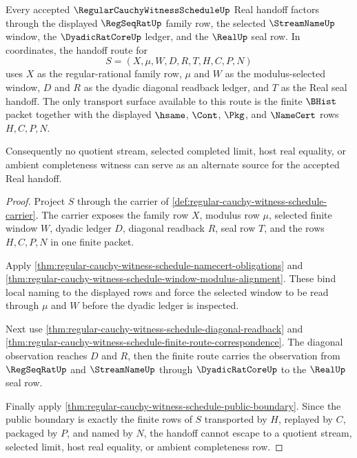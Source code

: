 \begin{theorem}
\label{thm:regular-cauchy-witness-schedule-real-handoff-dependency}
Every accepted $\RegularCauchyWitnessScheduleUp$ Real handoff factors through the displayed $\RegSeqRatUp$ family row, the selected $\StreamNameUp$ window, the $\DyadicRatCoreUp$ ledger, and the $\RealUp$ seal row. In coordinates, the handoff route for
$$
S=(X,\mu,W,D,R,T,H,C,P,N)
$$
uses $X$ as the regular-rational family row, $\mu$ and $W$ as the modulus-selected window, $D$ and $R$ as the dyadic diagonal readback ledger, and $T$ as the Real seal handoff. The only transport surface available to this route is the finite $\BHist$ packet together with the displayed $\hsame$, $\Cont$, $\Pkg$, and $\NameCert$ rows $H,C,P,N$.

Consequently no quotient stream, selected completed limit, host real equality, or ambient completeness witness can serve as an alternate source for the accepted Real handoff.
\end{theorem}
\begin{proof}
Project $S$ through the carrier of \autoref{def:regular-cauchy-witness-schedule-carrier}. The carrier exposes the family row $X$, modulus row $\mu$, selected finite window $W$, dyadic ledger $D$, diagonal readback $R$, seal row $T$, and the rows $H,C,P,N$ in one finite packet.

Apply \autoref{thm:regular-cauchy-witness-schedule-namecert-obligations} and \autoref{thm:regular-cauchy-witness-schedule-window-modulus-alignment}. These bind local naming to the displayed rows and force the selected window to be read through $\mu$ and $W$ before the dyadic ledger is inspected.

Next use \autoref{thm:regular-cauchy-witness-schedule-diagonal-readback} and \autoref{thm:regular-cauchy-witness-schedule-finite-route-correspondence}. The diagonal observation reaches $D$ and $R$, then the finite route carries the observation from $\RegSeqRatUp$ and $\StreamNameUp$ through $\DyadicRatCoreUp$ to the $\RealUp$ seal row.

Finally apply \autoref{thm:regular-cauchy-witness-schedule-public-boundary}. Since the public boundary is exactly the finite rows of $S$ transported by $H$, replayed by $C$, packaged by $P$, and named by $N$, the handoff cannot escape to a quotient stream, selected limit, host real equality, or ambient completeness row.
\end{proof}

